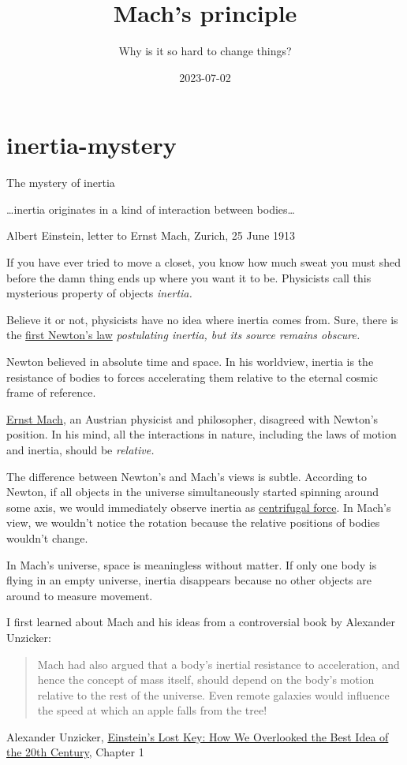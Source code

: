 \documentclass{article}
\title{Mach's principle}
\subtitle{Why is it so hard to change things?}
\date{2023-07-02}
\begin{document}
\section{inertia-mystery}{The mystery of inertia}
\epigraph{
  \ldots inertia originates in a kind of interaction between bodies\ldots
}{
  Albert Einstein, letter to Ernst Mach, Zurich, 25 June 1913
}

If you have ever tried to move a closet, you know how much sweat you must shed before the damn thing ends up where you want it to be.
Physicists call this mysterious property of objects \em{inertia}.

Believe it or not, physicists have no idea where inertia comes from.
Sure, there is the \href{https://en.wikipedia.org/wiki/Newton's_laws_of_motion}{first Newton's law} \em{postulating} inertia, but its source remains obscure.

Newton believed in absolute time and space.
In his worldview, inertia is the resistance of bodies to forces accelerating them relative to the eternal cosmic frame of reference.

\href{https://en.wikipedia.org/wiki/Ernst_Mach}{Ernst Mach}, an Austrian physicist and philosopher, disagreed with Newton's position.
In his mind, all the interactions in nature, including the laws of motion and inertia, should be \em{relative}.


The difference between Newton's and Mach's views is subtle.
According to Newton, if all objects in the universe simultaneously started spinning around some axis, we would immediately observe inertia as \href{https://en.wikipedia.org/wiki/Centrifugal_force}{centrifugal force}.
In Mach's view, we wouldn't notice the rotation because the relative positions of bodies wouldn't change.

In Mach's universe, space is meaningless without matter.
If only one body is flying in an empty universe, inertia disappears because no other objects are around to measure movement.

I first learned about Mach and his ideas from a controversial book by Alexander Unzicker:

\blockquote{
    Mach had also argued that a body's inertial resistance to acceleration, and hence the concept of mass itself, should depend on the body's motion relative to the rest of the universe.
    Even remote galaxies would influence the speed at which an apple falls from the tree!
}{Alexander Unzicker, \href{https://www.amazon.com/Einsteins-Lost-Key-Overlooked-Century/dp/1519473435}{Einstein's Lost Key: How We Overlooked the Best Idea of the 20th Century}, Chapter 1}
\end{document}
